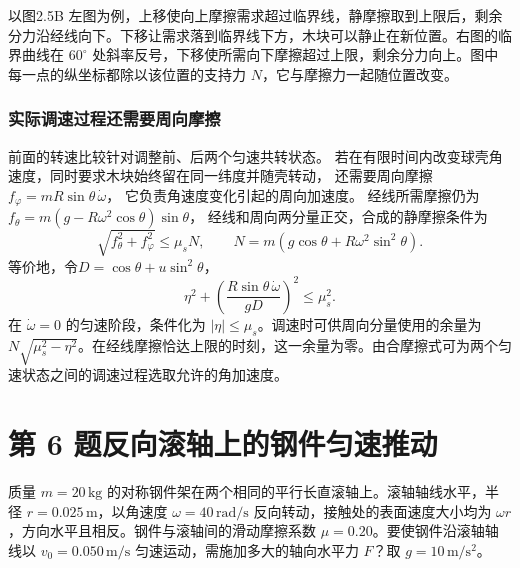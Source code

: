 \documentclass[UTF8,fontset=fandol,a4paper,11pt]{ctexart}
\newcommand{\tagline}[1]{\noindent{\small\color{muted}#1}\par}
\newcommand{\figcaption}[1]{\par\vspace{2pt}{\small\color{muted}#1}\par}
\begin{document}
以图2.5B 左图为例，上移使向上摩擦需求超过临界线，静摩擦取到上限后，剩余分力沿经线向下。下移让需求落到临界线下方，木块可以静止在新位置。右图的临界曲线在 $60^\circ$ 处斜率反号，下移使所需向下摩擦超过上限，剩余分力向上。图中每一点的纵坐标都除以该位置的支持力 $N$，它与摩擦力一起随位置改变。

\subsubsection*{实际调速过程还需要周向摩擦}
前面的转速比较针对调整前、后两个匀速共转状态。
若在有限时间内改变球壳角速度，同时要求木块始终留在同一纬度并随壳转动，
还需要周向摩擦$f_\varphi=mR\sin\theta\,\dot\omega$，
它负责角速度变化引起的周向加速度。
经线所需摩擦仍为$f_\theta=m(g-R\omega^2\cos\theta)\sin\theta$，
经线和周向两分量正交，合成的静摩擦条件为
\[
\sqrt{f_\theta^2+f_\varphi^2}\leq\mu_sN,
\qquad N=m(g\cos\theta+R\omega^2\sin^2\theta).
\]
等价地，令$D=\cos\theta+u\sin^2\theta$，
\[
\eta^2+
\left(\frac{R\sin\theta\,\dot\omega}{gD}\right)^2
\leq\mu_s^2.
\]
在 $\dot\omega=0$ 的匀速阶段，条件化为 $|\eta|\leq\mu_s$。调速时可供周向分量使用的余量为 $N\sqrt{\mu_s^2-\eta^2}$。在经线摩擦恰达上限的时刻，这一余量为零。由合摩擦式可为两个匀速状态之间的调速过程选取允许的角加速度。




\section*{第 6 题\quad 反向滚轴上的钢件匀速推动}

\tagline{M-02-06}

质量 $m=20\,\mathrm{kg}$ 的对称钢件架在两个相同的平行长直滚轴上。滚轴轴线水平，半径 $r=0.025\,\mathrm m$，以角速度 $\omega=40\,\mathrm{rad/s}$ 反向转动，接触处的表面速度大小均为 $\omega r$，方向水平且相反。钢件与滚轴间的滑动摩擦系数 $\mu=0.20$。要使钢件沿滚轴轴线以 $v_0=0.050\,\mathrm{m/s}$ 匀速运动，需施加多大的轴向水平力 $F$？取 $g=10\,\mathrm{m/s^2}$。

\begin{center}\begin{minipage}{\linewidth}\centering{}
\figcaption{图 2.6\quad 两接触处的横向表面速度相反。}
\end{minipage}\end{center}
\end{document}
